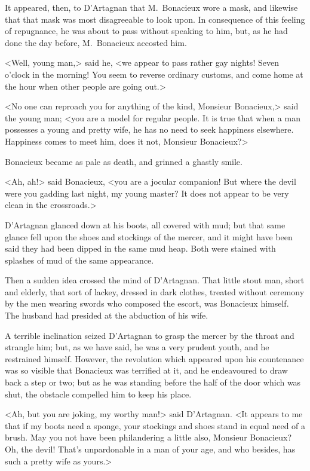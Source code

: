 It appeared, then, to D'Artagnan that M.~Bonacieux wore a mask, and likewise that that mask was most disagreeable to look upon. In consequence of this feeling of repugnance, he was about to pass without speaking to him, but, as he had done the day before, M.~Bonacieux accosted him. 

<Well, young man,> said he, <we appear to pass rather gay nights! Seven o'clock in the morning!  You seem to reverse ordinary customs, and come home at the hour when other people are going out.> 

<No one can reproach you for anything of the kind, Monsieur Bonacieux,> said the young man; <you are a model for regular people. It is true that when a man possesses a young and pretty wife, he has no need to seek happiness elsewhere. Happiness comes to meet him, does it not, Monsieur Bonacieux?> 

Bonacieux became as pale as death, and grinned a ghastly smile. 

<Ah, ah!> said Bonacieux, <you are a jocular companion! But where the devil were you gadding last night, my young master? It does not appear to be very clean in the crossroads.> 

D'Artagnan glanced down at his boots, all covered with mud; but that same glance fell upon the shoes and stockings of the mercer, and it might have been said they had been dipped in the same mud heap. Both were stained with splashes of mud of the same appearance. 

Then a sudden idea crossed the mind of D'Artagnan. That little stout man, short and elderly, that sort of lackey, dressed in dark clothes, treated without ceremony by the men wearing swords who composed the escort, was Bonacieux himself. The husband had presided at the abduction of his wife. 

A terrible inclination seized D'Artagnan to grasp the mercer by the throat and strangle him; but, as we have said, he was a very prudent youth, and he restrained himself. However, the revolution which appeared upon his countenance was so visible that Bonacieux was terrified at it, and he endeavoured to draw back a step or two; but as he was standing before the half of the door which was shut, the obstacle compelled him to keep his place. 

<Ah, but you are joking, my worthy man!> said D'Artagnan. <It appears to me that if my boots need a sponge, your stockings and shoes stand in equal need of a brush. May you not have been philandering a little also, Monsieur Bonacieux? Oh, the devil! That's unpardonable in a man of your age, and who besides, has such a pretty wife as yours.> 

